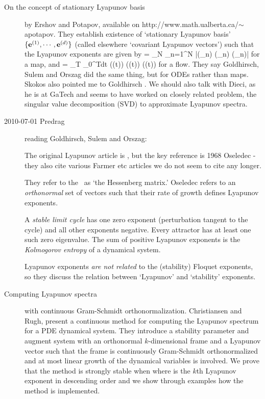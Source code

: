 \begin{description}
\item[On the concept of stationary {L}yapunov basis] by Ershov
and Potapov, available on
{http://www.math.ualberta.ca/$\sim$apotapov}. They establish
existence of `stationary {L}yapunov basis'					\toCB
$\{\jEigvec[1],\cdots,\jEigvec[d]\}$ (called elsewhere `covariant
Lyapunov vectors') such that the Lyapunov
exponents are given by										\toCB
\beq
    \eigExp[j] = \lim_{N \to \infty} 
         \sum_{n=1}^{N} \ln
    |\jEigvecT[j](\ssp_n) \jMps(\ssp_n) \jEigvec[j](\ssp_n)|
for a map, and
\beq
    \eigExp[j] = \lim_{T \to \infty} 
         \int_0^{T}dt
    \jEigvecT[j](\ssp(t)) \Mvar(\ssp(t)) \jEigvec[j](\ssp(t))
for a flow.
They say Goldhirsch, Sulem and Orszag
did the same thing, but for ODEs rather than maps.
Skokos also pointed me to Goldhirsch \etal. We should also
talk with Dieci,
as he is at GaTech and seems to have
worked on closely related problem, the singular value decomposition
(SVD) to approximate Lyapunov spectra.

\item[2010-07-01 Predrag] reading
Goldhirsch, Sulem and Orszag:

The original Lyapunov article is ,
but the key reference is 1968 Oseledec -
they also cite various Farmer etc articles we do not seem to
cite any longer.

They refer to the \stabmat\ as `the Hessenberg matrix.'
    										\toCB
Oseledec refers to an {\em orthonormal} set of vectors such
that their rate of growth defines Lyapunov exponents.

A \emph{stable limit cycle} has one zero exponent
(perturbation tangent to the
cycle) and all other exponents negative.
Every attractor has at least one such zero eigenvalue.
										\toCB
The sum of positive Lyapunov exponents is the
\emph{Kolmogorov entropy} of a dynamical system.

Lyapunov exponents \emph{are not related} to the (stability)
Floquet exponents, so they discuss the relation between
`Lyapunov' and `stability' exponents.
						\toCB


\item[Computing {L}yapunov spectra] with continuous
         {Gram-Schmidt} orthonormalization.
Christiansen and Rugh,
present a
  continuous method for computing the Lyapunov
  spectrum for a PDE dynamical system. They introduce a
  stability parameter and augment system with
  an orthonormal $k$-dimensional frame and a Lyapunov vector such
  that the frame is continuously Gram-Schmidt orthonormalized
  and at most linear growth of the dynamical variables is
  involved. We prove that the method is strongly stable when
  where is the $k$th Lyapunov exponent in descending order and we
  show through examples how the method is implemented.


\end{description}
